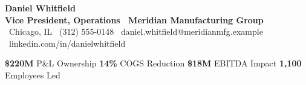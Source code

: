 \documentclass[10pt]{article}
\begin{document}
\linespread{1.07}\selectfont

\begin{center}
{\fontsize{27}{30}\selectfont\bfseries\color{navy}Daniel Whitfield}\\[5pt]
{\Large\bfseries\color{gold}Vice President, Operations \textbar\ Meridian Manufacturing Group}\\[7pt]
{\small\color{slate}
\faMapMarker\ Chicago, IL \quad
\faPhone\ (312) 555-0148 \quad
\faEnvelope\ daniel.whitfield@meridianmfg.example \quad
\faLinkedin\ linkedin.com/in/danielwhitfield
}
\end{center}

\vspace{9pt}

\begin{tcolorbox}[colback=navy, colframe=navy, arc=2pt, boxrule=0pt, left=8pt, right=8pt, top=8pt, bottom=8pt]
\centering
\color{white}
\textbf{\Large\$220M} {\footnotesize P\&L Ownership}
\quad{\color{gold}\textbar}\quad
\textbf{\Large 14\%} {\footnotesize COGS Reduction}
\quad{\color{gold}\textbar}\quad
\textbf{\Large\$18M} {\footnotesize EBITDA Impact}
\quad{\color{gold}\textbar}\quad
\textbf{\Large 1{,}100} {\footnotesize Employees Led}
\end{tcolorbox}

\vspace{11pt}
\end{document}
